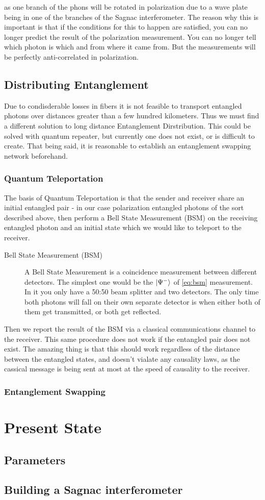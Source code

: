 \documentclass{article}
\begin{document}
\par as one branch of the phons will be rotated in polarization due to a wave plate being in one of the branches of the Sagnac interferometer.
The reason why this is important is that if the conditions for this to happen are satisfied, you can no longer 
predict the result of the polarization measurement. You can no longer tell which photon is which and from where it came from.
But the measurements will be perfectly anti-correlated in polarization. 

\subsection{Distributing Entanglement}
Due to condisderable losses in fibers it is not feasible to transport entangled photons over distances greater than a few hundred kilometers. Thus 
we must find a different solution to long distance Entanglement Dirstribution. This could be solved with quantum repeater, but currently one does not exist, 
or is difficult to create. That being said, it is reasonable to establish an entanglement swapping network beforehand.

\subsubsection{Quantum Teleportation}
The basis of Quantum Teleportation is that the sender and receiver share an initial entangled pair - in our case polarization entangled photons of the sort described
above, then perform a Bell State Measurement (BSM) on the receiving entangled photon and an initial state which we would like to teleport to the receiver. 

\begin{description}
	\item[Bell State Measurement (BSM)] 
		A Bell State Measurement is a coincidence measurement between different detectors. The simplest one would
		be the $\ket{\Psi^-}$ of \ref{eq:bsm} measurement. In it you only have a 50:50 beam splitter and two detectors. The only
		time both photons will fall on their own separate detector is when either both of them get transmitted,
		or both get reflected. 
\end{description}

Then we report the result of the BSM via a classical communications channel to the receiver. This same procedure does not work if the entangled pair does 
not exist.
The amazing thing is that this should work regardless of the distance between the entangled states, and doesn't vialate any causality laws, as the cassical message
is being sent at most at the speed of causality to the receiver.


\subsubsection{Entanglement Swapping}
\section{Present State}
\subsection{Parameters}
\subsection{Building a Sagnac interferometer}
\end{document}
